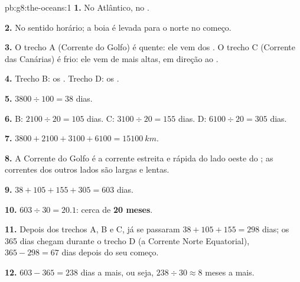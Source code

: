 \begin{solution}{pb:g8:the-oceans:1}
\textbf{1.} No  Atlântico, no .

\textbf{2.} No sentido horário; a boia é levada para o norte no começo.

\textbf{3.} O trecho A (Corrente do Golfo) é quente: ele vem dos
. O trecho C (Corrente das Canárias) é frio: ele vem de 
mais altas, em direção ao .

\textbf{4.} Trecho B: os . Trecho D: os .

\textbf{5.} $3800 \div 100 = 38$ dias.

\textbf{6.} B: $2100 \div 20 = 105$ dias. C: $3100 \div 20 = 155$ dias.
D: $6100 \div 20 = 305$ dias.

\textbf{7.} $3800 + 2100 + 3100 + 6100 = \qty{15100}{km}$.

\textbf{8.} A Corrente do Golfo é a corrente estreita e rápida do lado
oeste do ; as correntes dos outros lados são largas e lentas.

\textbf{9.} $38 + 105 + 155 + 305 = 603$ dias.

\textbf{10.} $603 \div 30 = 20.1$: cerca de \textbf{20 meses}.

\textbf{11.} Depois dos trechos A, B e C, já se passaram $38 + 105 + 155 = 298$
dias; os 365 dias chegam durante o trecho D (a Corrente Norte Equatorial), $365 -
298 = 67$ dias depois do seu começo.

\textbf{12.} $603 - 365 = 238$ dias a mais, ou seja, $238 \div 30 \approx 8$
meses a mais.
\end{solution}
